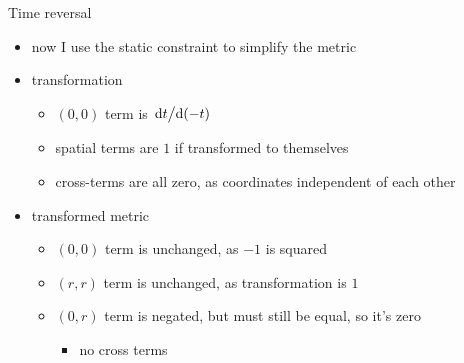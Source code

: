 \documentclass{beamer}
\begin{document}
\begin{frame}{Time reversal}
{  \begin{itemize}
  \item now I use the static constraint to simplify the metric
  \item transformation
    \begin{itemize}
    \item $(0,0)$ term is $\dv*{t}{(-t)}$
    \item spatial terms are $1$ if transformed to themselves
    \item cross-terms are all zero, as coordinates independent of each other
    \end{itemize}
  \item transformed metric
    \begin{itemize}
    \item $(0,0)$ term is unchanged, as $-1$ is squared
    \item $(r,r)$ term is unchanged, as transformation is $1$
    \item $(0,r)$ term is negated, but must still be equal, so it's zero
      \begin{itemize}
      \item no cross terms
      \end{itemize}
    \end{itemize}
  \end{itemize}

}

\end{frame}

\end{document}
